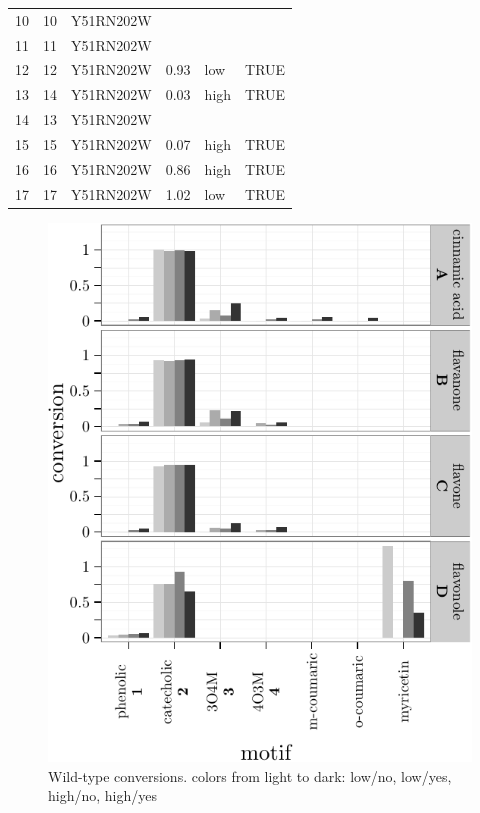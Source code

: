 \documentclass[]{tufte-handout}
\begin{document}
\begin{table}[ht]
\begin{tabular}{rllrll}
  10 & 10 & Y51RN202W &  &  &  \\ 
  11 & 11 & Y51RN202W &  &  &  \\ 
  12 & 12 & Y51RN202W & 0.93 & low & TRUE \\ 
  13 & 14 & Y51RN202W & 0.03 & high & TRUE \\ 
  14 & 13 & Y51RN202W &  &  &  \\ 
  15 & 15 & Y51RN202W & 0.07 & high & TRUE \\ 
  16 & 16 & Y51RN202W & 0.86 & high & TRUE \\ 
  17 & 17 & Y51RN202W & 1.02 & low & TRUE \\ 
   \bottomrule
\end{tabular}
\end{table}

\begin{figure}
 \includegraphics{tufte_files/figure-latex/unnamed-chunk-15-1.pdf}
\caption{Wild-type conversions. colors from light to dark: low/no, low/yes, high/no, high/yes}
\end{figure}\begin{figure}

\end{figure}
\end{document}
